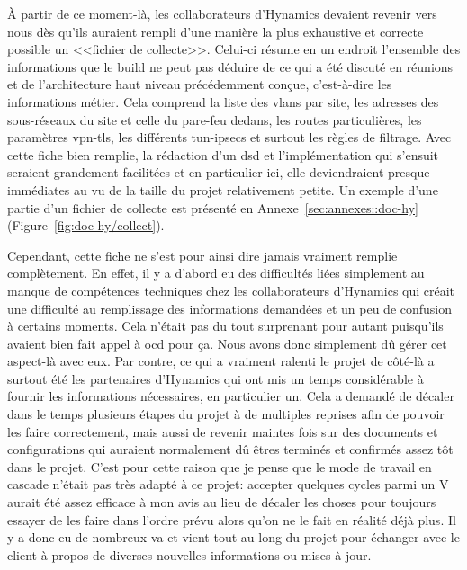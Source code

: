 \documentclass[12pt, oneside, a4paper, titlepage]{report}
\begin{document}
À partir de ce moment-là, les collaborateurs d'Hynamics devaient revenir vers
nous dès qu'ils auraient rempli d'une manière la plus exhaustive et correcte
possible un <<fichier de collecte>>. Celui-ci résume en un endroit l'ensemble
des informations que le \gls{build} ne peut pas déduire de ce qui a été discuté
en réunions et de l'architecture haut niveau précédemment conçue, c'est-à-dire
les informations métier. Cela comprend la liste des \glspl{vlan} par site, les
adresses des sous-réseaux du site et celle du pare-feu dedans, les routes
particulières, les paramètres \gls{vpn-tls}, les différents \glspl{tun-ipsec} et
surtout les règles de filtrage. Avec cette fiche bien remplie, la rédaction d'un
\gls{dsd} et l'implémentation qui s'ensuit seraient grandement facilitées et en
particulier ici, elle deviendraient presque immédiates au vu de la taille du
projet relativement petite. Un exemple d'une partie d'un fichier de collecte est
présenté en Annexe~\ref{sec:annexes::doc-hy} (Figure~\ref{fig:doc-hy/collect}).

Cependant, cette fiche ne s'est pour ainsi dire jamais vraiment remplie
complètement. En effet, il y a d'abord eu des difficultés liées simplement au
manque de compétences techniques chez les collaborateurs d'Hynamics qui créait
une difficulté au remplissage des informations demandées et un peu de confusion
à certains moments. Cela n'était pas du tout surprenant pour autant puisqu'ils
avaient bien fait appel à \gls{ocd} pour ça. Nous avons donc simplement dû gérer
cet aspect-là avec eux. Par contre, ce qui a vraiment ralenti le projet de
côté-là a surtout été les partenaires d'Hynamics qui ont mis un temps
considérable à fournir les informations nécessaires, en particulier un. Cela a
demandé de décaler dans le temps plusieurs étapes du projet à de multiples
reprises afin de pouvoir les faire correctement, mais aussi de revenir maintes
fois sur des documents et configurations qui auraient normalement dû êtres
terminés et confirmés assez tôt dans le projet. C'est pour cette raison que je
pense que le mode de travail en cascade n'était pas très adapté à ce projet:
accepter quelques cycles parmi un V aurait été assez efficace à mon avis au lieu
de décaler les choses pour toujours essayer de les faire dans l'ordre prévu
alors qu'on ne le fait en réalité déjà plus. Il y a donc eu de nombreux
va-et-vient tout au long du projet pour échanger avec le client à propos de
diverses nouvelles informations ou mises-à-jour.
\end{document}
